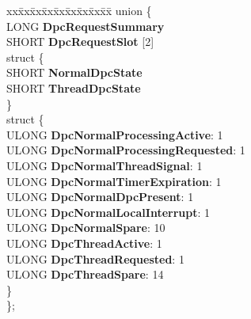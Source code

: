 \begin{DoxyCompactItemize}
\begin{tabbing}
xx\=xx\=xx\=xx\=xx\=xx\=xx\=xx\=xx\=\kill
union \{\\
\>LONG {\bfseries DpcRequestSummary}\\
\>SHORT {\bfseries DpcRequestSlot} \mbox{[}2\mbox{]}\\
\mbox{\label{union___k_p_r_c_b_1_1_0D1952_ab869b10ed45cc53bc6f87b8109a38586}} 
\>struct \{\\
\>\>SHORT {\bfseries NormalDpcState}\\
\>\>SHORT {\bfseries ThreadDpcState}\\
\>\} \\
\mbox{\label{union___k_p_r_c_b_1_1_0D1952_af0f4466b7aca2c6d8ed1a9db1b7eb42c}} 
\>struct \{\\
\>\>ULONG {\bfseries DpcNormalProcessingActive}: 1\\
\>\>ULONG {\bfseries DpcNormalProcessingRequested}: 1\\
\>\>ULONG {\bfseries DpcNormalThreadSignal}: 1\\
\>\>ULONG {\bfseries DpcNormalTimerExpiration}: 1\\
\>\>ULONG {\bfseries DpcNormalDpcPresent}: 1\\
\>\>ULONG {\bfseries DpcNormalLocalInterrupt}: 1\\
\>\>ULONG {\bfseries DpcNormalSpare}: 10\\
\>\>ULONG {\bfseries DpcThreadActive}: 1\\
\>\>ULONG {\bfseries DpcThreadRequested}: 1\\
\>\>ULONG {\bfseries DpcThreadSpare}: 14\\
\>\} \\
\}; \\


\end{tabbing}
\end{DoxyCompactItemize}
